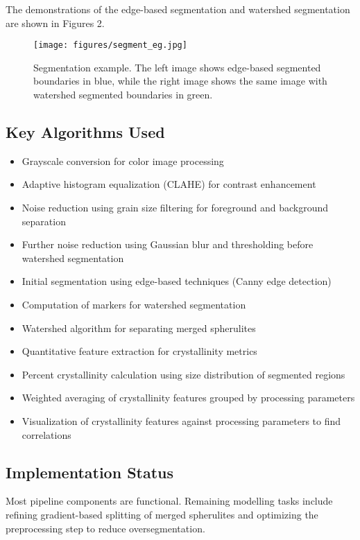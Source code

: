 \documentclass[12pt]{article}
\begin{document}
The demonstrations of the edge-based segmentation and watershed segmentation are shown in Figures 2. 

\begin{figure}[ht]
    \centering
    \texttt{[image: figures/segment\_eg.jpg]}
    \caption{\centering Segmentation example. The left image shows edge-based segmented boundaries in blue, while the right image shows the same image with watershed segmented boundaries in green.}
\end{figure}

\subsection{Key Algorithms Used}
\begin{itemize}[noitemsep]
    \item Grayscale conversion for color image processing
    \item Adaptive histogram equalization (CLAHE) for contrast enhancement
    \item Noise reduction using grain size filtering for foreground and background separation
    \item Further noise reduction using Gaussian blur and thresholding before watershed segmentation
    \item Initial segmentation using edge-based techniques (Canny edge detection)
    \item Computation of markers for watershed segmentation
    \item Watershed algorithm for separating merged spherulites
    \item Quantitative feature extraction for crystallinity metrics
    \item Percent crystallinity calculation using size distribution of segmented regions
    \item Weighted averaging of crystallinity features grouped by processing parameters
    \item Visualization of crystallinity features against processing parameters to find correlations
\end{itemize}

\subsection{Implementation Status}
Most pipeline components are functional. Remaining modelling tasks include refining gradient-based splitting of merged spherulites and 
optimizing the preprocessing step to reduce oversegmentation. 
\end{document}
